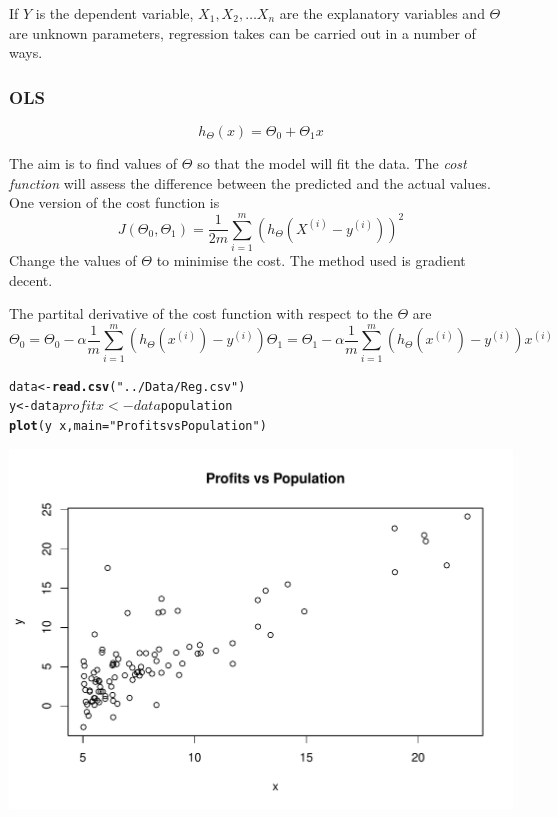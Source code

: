 \documentclass[12pt, a4paper, oneside]{article}\usepackage{graphicx, color}
\makeatletter
\def\maxwidth{ %
  \ifdim\Gin@nat@width>\linewidth
    \linewidth
  \else
    \Gin@nat@width
  \fi
}
\newcommand{\hlfunctioncall}[1]{\textcolor[rgb]{0.501960784313725,0,0.329411764705882}{\textbf{#1}}}%
\newcommand{\hlstring}[1]{\textcolor[rgb]{0.6,0.6,1}{#1}}%
\newenvironment{kframe}{%
 \def\at@end@of@kframe{}%
 \ifinner\ifhmode%
  \def\at@end@of@kframe{\end{minipage}}%
  \begin{minipage}{\columnwidth}%
 \fi\fi%
 \def\FrameCommand##1{\hskip\@totalleftmargin \hskip-\fboxsep
 \colorbox{shadecolor}{##1}\hskip-\fboxsep
     \hskip-\linewidth \hskip-\@totalleftmargin \hskip\columnwidth}%
 \MakeFramed {\advance\hsize-\width
   \@totalleftmargin\z@ \linewidth\hsize
   \@setminipage}}%
 {\par\unskip\endMakeFramed%
 \at@end@of@kframe}
\newenvironment{knitrout}{}{} %
\makeatother
\begin{document}
If $Y$ is the dependent variable, $X_1, X_2, \dots X_n$ are the explanatory variables and $\Theta$ are unknown parameters, regression takes can be carried out in a number of ways. 

\subsubsection{OLS}
\begin{equation}
h_{\Theta}(x) = \Theta_0 + \Theta_1 x
\end{equation}

The aim is to find values of $\Theta$ so that the model will fit the data.  The \emph{cost function} will assess the difference between the predicted and the actual values. One version of the cost function is 
\begin{equation}
J(\Theta_0, \Theta_1) = \frac{1}{2m} \sum_{i=1}^m (h_{\Theta}(X^{(i)} - y^{(i)}))^2
\end{equation}
Change the values of $\Theta$ to minimise the cost. The method used is gradient decent. 

The partital derivative of the cost function with respect to the $\Theta$ are
\begin{subequations}
\begin{equation}
\Theta_0 = \Theta_0 - \alpha \frac{1}{m}\sum_{i=1}^m (h_{\Theta}(x^{(i)}) - y^{(i)})
\end{equation}
\begin{equation}
\Theta_1 = \Theta_1 - \alpha \frac{1}{m}\sum_{i=1}^m (h_{\Theta}(x^{(i)}) - y^{(i)})x^{(i)}
\end{equation}
\end{subequations}

\begin{knitrout}
\color{fgcolor}\begin{kframe}
\begin{alltt}
data <- \hlfunctioncall{read.csv}(\hlstring{"../Data/Reg.csv"})
y <- data$profit
x <- data$population
\hlfunctioncall{plot}(y ~ x, main = \hlstring{"Profits vs Population"})
\end{alltt}
\end{kframe}
\includegraphics[width=\maxwidth]{figure/Regression} 

\end{knitrout}
\end{document}
